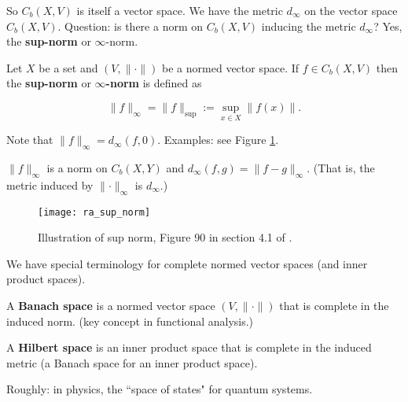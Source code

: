So \(C_b(X, V)\) is itself a vector space. We have the metric \(d_\infty\) on the vector space \(C_b(X, V)\). Question: is there a norm on \(C_b(X, V)\) inducing the metric \(d_\infty\)? Yes, the \textbf{sup-norm} or \(\infty\)-norm.

\begin{definition}

Let \(X\) be a set and \((V, \lVert \cdot \rVert)\) be a normed vector space. If \(f \in C_b(X, V)\) then the \textbf{sup-norm} or \textbf{\(\infty\)-norm} is defined as 

\[
\lVert f \rVert_\infty = \lVert f \rVert_{\text{sup}} := \sup_{x \in X} \lVert f(x) \rVert.
\]

\end{definition}

Note that \(\lVert f \rVert_\infty = d_\infty(f,0)\). Examples: see Figure \ref{ra_sup_norm_fig}.

\begin{exercise}

\(\lVert f \rVert_\infty \) is a norm on \(C_b(X,Y)\) and \(d_\infty(f, g) = \lVert f - g \rVert_\infty\). (That is, the metric induced by \(\lVert \cdot \rVert_\infty\) is \(d_\infty\).)

\end{exercise} 



\begin{figure}[htbp]
\begin{center}
\texttt{[image: ra\_sup\_norm]}
\caption{Illustration of sup norm, Figure 90 in section 4.1 of \citet{pugh2015real}.}
\label{ra_sup_norm_fig}
\end{center}
\end{figure}

We have special terminology for complete normed vector spaces (and inner product spaces). 

\begin{definition}

A \textbf{Banach space} is a normed vector space \((V, \lVert \cdot \rVert )\) that is complete in the induced norm. (key concept in functional analysis.)

\end{definition}

\begin{definition}

A \textbf{Hilbert space} is an inner product space that is complete in the induced metric (a Banach space for an inner product space).

Roughly: in physics, the ``space of states" for quantum systems.

\end{definition}

